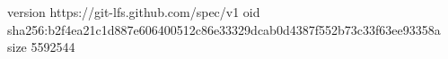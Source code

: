 version https://git-lfs.github.com/spec/v1
oid sha256:b2f4ea21c1d887e606400512c86e33329dcab0d4387f552b73c33f63ee93358a
size 5592544
